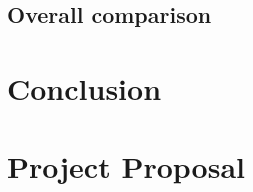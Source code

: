 \documentclass[12pt,a4paper,twoside,openright]{report}
\begin{document}
\section{Overall comparison}




\chapter{Conclusion}
\label{conclusion}







\appendix


\chapter{Project Proposal}


\end{document}

